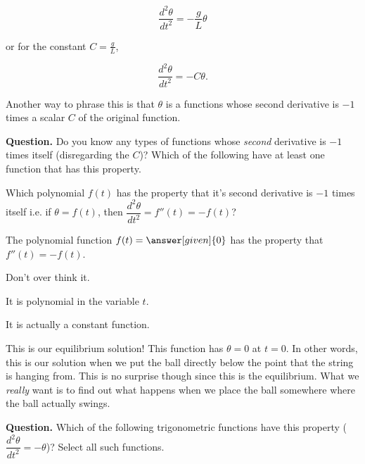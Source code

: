 \documentclass[handout,nooutcomes]{ximera}
\begin{document}
\begin{example}
\begin{explanation}
\[
\dfrac{d^2 \theta}{d t^2}  = -\dfrac{g}{L} \theta
\]

or for the constant $C=\frac{g}{L}$,

\[
\dfrac{d^2 \theta}{d t^2}  = -C \theta.
\]

Another way to phrase this is that $\theta$ is a functions whose
second derivative is $-1$ times a scalar $C$ of the original function.


\textbf{Question.}  Do you know any types of functions whose \emph{second} derivative
is $-1$ times itself (disregarding the $C$)? Which of the following have at least one function that has this property.

\begin{selectAll}
\end{selectAll}


\begin{problem}
Which polynomial $f(t)$ has the property that it's second
derivative is $-1$ times itself i.e. if
$\theta=f(t)$, then $\dfrac{d^2 \theta}{d t^2} = f''(t) = -f(t)$?


The polynomial function $f(t) = \answer[given]{0}$ has the property that $f''(t) = -f(t)$.

\begin{hint}
Don't over think it.
\end{hint}
\begin{hint}
It is polynomial in the variable $t$.
\end{hint}
\begin{hint}
It is actually a constant function.
\end{hint}
\end{problem}

This is our equilibrium solution! This function has $\theta=0$ at $t=0$. In other
words, this is our solution when we put the ball directly below the point
that the string is hanging from. This is no surprise though since this
is the equilibrium. What we \emph{really} want is to find out what happens
when we place the ball somewhere where the ball actually swings.


\textbf{Question.}  Which of the following trigonometric functions have this property
($\dfrac{d^2 \theta}{d t^2} = -\theta$)? Select all such functions.
\begin{selectAll}
\end{selectAll}



\end{explanation}
\end{example}
\end{document}

